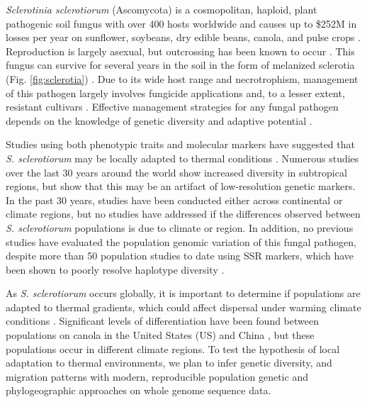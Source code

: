 \documentclass[12pt,letterpaper]{article}
\begin{document}
\textit{Sclerotinia sclerotiorum} (Ascomycota) is a cosmopolitan, haploid, plant pathogenic soil fungus with over 400 hosts worldwide \citep{bolton2006sclerotinia} and causes up to \$252M in losses per year on sunflower, soybeans, dry edible beans, canola, and pulse crops \citep{uscanola}.
Reproduction is largely asexual, but outcrossing has been known to occur \citep{bolton2006sclerotinia,attanayake2014inferring}. 
This fungus can survive for several years in the soil in the form of melanized sclerotia (Fig. \ref{fig:sclerotia}) \citep{bolton2006sclerotinia}.
Due to its wide host range and necrotrophism, management of this pathogen largely involves fungicide applications and, to a lesser extent, resistant cultivars \citep{bolton2006sclerotinia}.
Effective management strategies for any fungal pathogen depends on the knowledge of genetic diversity and adaptive potential \citep{grunwald2016population}. 

Studies using both phenotypic traits and molecular markers have suggested that \textit{S. sclerotiorum} may be locally adapted to thermal conditions \citep{huang1991temperature,carbone2001microbial}.
Numerous studies over the last 30 years around the world show increased diversity in subtropical regions, but \citet{lehner2017sclerotinia} show that this may be an artifact of low-resolution genetic markers.
In the past 30 years, studies have been conducted either across continental or climate regions, but no studies have addressed if the differences observed between \textit{S. sclerotiorum} populations is due to climate or region.
In addition, no previous studies have evaluated the population genomic variation of this fungal pathogen, despite more than 50 population studies to date using SSR markers, which have been shown to poorly resolve haplotype diversity \citep{lehner2017independently}. 


As \textit{S. sclerotiorum} occurs globally, it is important to determine if populations are adapted to thermal gradients, which could affect dispersal under warming climate conditions \citep{bolton2006sclerotinia,lehner2017sclerotinia,croll2016genetic}.
Significant levels of differentiation have been found between populations on canola in the United States (US) and China \citep{attanayake2013sclerotinia}, but these populations occur in different climate regions.
To test the hypothesis of local adaptation to thermal environments, we plan to infer genetic diversity, and migration patterns with modern, reproducible population genetic and phylogeographic approaches on whole genome sequence data. 
\end{document}
